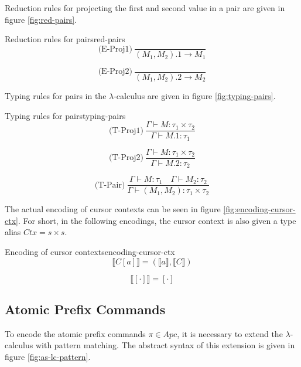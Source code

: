 Reduction rules for projecting the first and second value in a pair are given in figure \ref{fig:red-pairs}.

\begin{myfigure}{Reduction rules for pairs}{red-pairs}
    \[
        \text{(E-Proj1)} \ \frac{}{(M_1,M_2).1 \rightarrow M_1}
    \]

    \[
        \text{(E-Proj2)} \ \frac{}{(M_1,M_2).2 \rightarrow M_2}
    \]
\end{myfigure}

Typing rules for pairs in the $\lambda$-calculus are given in figure \ref{fig:typing-pairs}.

\begin{myfigure}{Typing rules for pairs}{typing-pairs}
    \[
        \text{(T-Proj1)} \ \frac{\Gamma \vdash M : \tau_1 \times \tau_2}{\Gamma \vdash M.1 : \tau_1}
    \]

    \[
        \text{(T-Proj2)} \ \frac{\Gamma \vdash M : \tau_1 \times \tau_2}{\Gamma \vdash M.2 : \tau_2}
    \]

    \[
        \text{(T-Pair)} \ \frac{\Gamma \vdash M : \tau_1 \quad \Gamma \vdash M_2 : \tau_2}{\Gamma \vdash (M_1,M_2) : \tau_1 \times \tau_2}
    \]
\end{myfigure}

The actual encoding of cursor contexts can be seen in figure \ref{fig:encoding-cursor-ctx}. For short, in the following encodings, the cursor context is also given a type alias $Ctx = s \times s$.

\begin{myfigure}{Encoding of cursor contexts}{encoding-cursor-ctx}
    \[
        \llbracket C[a] \rrbracket = (\llbracket a \rrbracket, \llbracket C \rrbracket)
    \]

    \[
        \llbracket [\cdot] \rrbracket = [\cdot]
    \]
\end{myfigure}

\subsection{Atomic Prefix Commands}
To encode the atomic prefix commands $\pi \in Apc$, it is necessary to extend the $\lambda$-calculus with pattern matching. The abstract syntax of this extension is given in figure \ref{fig:as-lc-pattern}.

